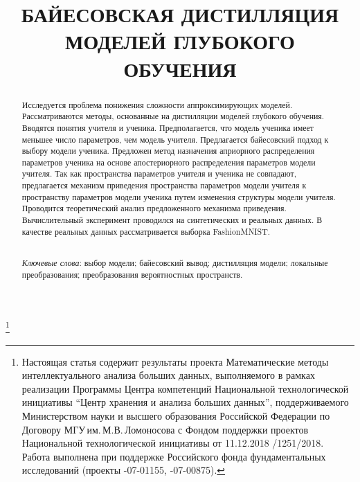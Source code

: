 \documentclass[12pt]{a&t}
\begin{document}

\title{БАЙЕСОВСКАЯ ДИСТИЛЛЯЦИЯ МОДЕЛЕЙ ГЛУБОКОГО ОБУЧЕНИЯ}%
\thanks{Настоящая статья содержит результаты проекта Математические методы интеллектуального анализа больших данных, выполняемого в рамках реализации Программы Центра компетенций Национальной технологической инициативы ``Центр хранения и анализа больших данных'', поддерживаемого Министерством науки и высшего образования Российской Федерации по Договору МГУ\,им.\,М.В.\,Ломоносова с Фондом поддержки проектов Национальной технологической инициативы от 11.12.2018 /1251/2018. Работа выполнена при поддержке Российского фонда фундаментальных исследований (проекты -07-01155, -07-00875).}


\maketitle

\begin{abstract}
Исследуется проблема понижения сложности аппроксимирующих моделей. 
Рассматриваются методы, основанные на дистилляции моделей глубокого обучения. 
Вводятся понятия учителя и ученика. Предполагается, что модель ученика имеет меньшее число параметров, чем модель учителя. 
Предлагается байесовский подход к выбору модели ученика. 
Предложен метод назначения априорного распределения параметров ученика на основе апостериорного распределения параметров модели учителя. 
Так как пространства параметров учителя и ученика не совпадают, предлагается механизм приведения пространства параметров модели учителя к пространству параметров модели ученика путем изменения структуры модели учителя.
Проводится теоретический анализ предложенного механизма приведения. Вычислительный эксперимент проводился на синтетических и реальных данных. В качестве реальных данных рассматривается выборка FashionMNIST.

\smallskip\\
\textit{Ключевые слова}: выбор модели; байесовский вывод; дистилляция модели; локальные преобразования; преобразования вероятностных пространств.
\end{abstract}
\end{document}
